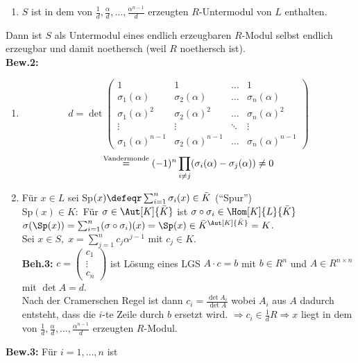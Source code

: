 \begin{Bew}
\begin{enumerate}
  \item $S$ ist in dem von $\frac{1}{d}, \frac{\alpha}{d}, \dots,
  \frac{\alpha^{n-1}}{d}$ erzeugten $R$-Untermodul von $L$ enthalten.
\end{enumerate}
Dann ist $S$ als Untermodul eines endlich erzeugbaren $R$-Modul selbst endlich
erzeugbar und damit noethersch (weil $R$ noethersch ist).\\
\textbf{Bew.2:}
\begin{enumerate}
  \item
  \[
  d = \det
  \begin{pmatrix}
  1 & 1 & \dots & 1 \\
  \sigma_1(\alpha) & \sigma_2(\alpha) & \dots & \sigma_n(\alpha) \\
  \sigma_1(\alpha)^2 & \sigma_2(\alpha)^2 & \dots & \sigma_n(\alpha)^2 \\
  \vdots & \vdots & \ddots & \vdots \\
  \sigma_1(\alpha)^{n-1} & \sigma_2(\alpha)^{n-1} & \dots & \sigma_n(\alpha)^{n-1}
  \end{pmatrix}
\]
\[
  \overset{\text{\scriptsize Vandermonde}}{=}(-1)^n \prod_{i \not= j}
  (\sigma_i(\alpha) - \sigma_j(\alpha)) \not= 0
\]
  \item Für $x \in L$ sei Sp$(x) \defeqr \sum_{i=1}^n \sigma_i(x) \in \bar{K}$
  (``Spur'')\\
  Sp$(x) \in K:$ Für $\sigma \in \Aut[K]{\bar{K}}$ ist $\sigma \circ \sigma_i \in
  \Hom[K]{L}{\bar{K}}$\\
  $\sigma(\Sp(x)) = \sum_{i=1}^n (\sigma \circ \sigma_i)(x) = \Sp(x)
  \in \bar{K}^{\Aut[K]{\bar{K}}} = K$.\\
  Sei $x \in S, \; x = \sum_{j=1}^n c_j \alpha^{j-1}$ mit $c_j \in K$.\\
  \textbf{Beh.3:} $c = \begin{pmatrix} c_1\\ \vdots\\ c_n \end{pmatrix}$ ist
  Lösung eines LGS $A \cdot c = b$ mit $b \in R^n$ und $A \in R^{n \times n}$
  mit $\det A = d$.\\
  Nach der Cramerschen Regel ist dann $c_i = \frac{\det A_i}{\det A}$ wobei
  $A_i$ aus $A$ dadurch entsteht, dass die $i$-te Zeile durch $b$ ersetzt wird.
  $\Rightarrow c_i \in \frac{1}{d}R \Rightarrow x$ liegt in dem von $\frac{1}{d}, \frac{\alpha}{d}, \dots,
  \frac{\alpha^{n-1}}{d}$ erzeugten $R$-Modul.
\end{enumerate}
\textbf{Bew.3:} Für $i=1, \dots, n$ ist

\end{Bew}
